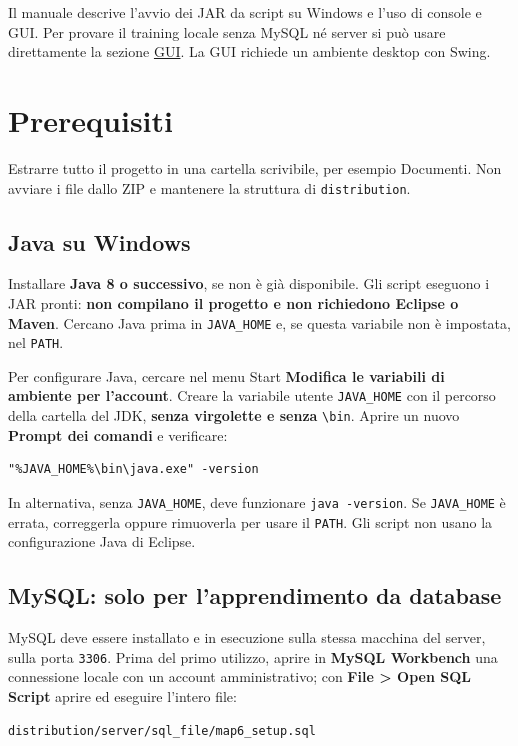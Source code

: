\documentclass[11pt,a4paper]{article}
\begin{document}

Il manuale descrive l'avvio dei JAR da script su Windows e l'uso di console e GUI.
Per provare il training locale senza MySQL né server si può usare direttamente
la sezione \hyperref[sec:gui]{GUI}. La GUI richiede un ambiente desktop con Swing.

\section*{Prerequisiti}

Estrarre tutto il progetto in una cartella scrivibile, per esempio Documenti.
Non avviare i file dallo ZIP e mantenere la struttura di \texttt{distribution}.

\subsection*{Java su Windows}

Installare \textbf{Java 8 o successivo}, se non è già disponibile.
Gli script eseguono i JAR pronti: \textbf{non compilano il progetto e non
richiedono Eclipse o Maven}. Cercano Java prima in \texttt{JAVA\_HOME} e,
se questa variabile non è impostata, nel \texttt{PATH}.

Per configurare Java, cercare nel menu Start \textbf{Modifica le variabili di
ambiente per l'account}. Creare la variabile utente \texttt{JAVA\_HOME} con
il percorso della cartella del JDK, \textbf{senza virgolette e senza}
\texttt{\textbackslash bin}. Aprire un nuovo \textbf{Prompt dei comandi} e verificare:
\begin{lstlisting}
"%JAVA_HOME%\bin\java.exe" -version
\end{lstlisting}

In alternativa, senza \texttt{JAVA\_HOME}, deve funzionare \texttt{java -version}.
Se \texttt{JAVA\_HOME} è errata, correggerla oppure rimuoverla per usare il
\texttt{PATH}. Gli script non usano la configurazione Java di Eclipse.

\subsection*{MySQL: solo per l'apprendimento da database}

MySQL deve essere installato e in esecuzione sulla stessa macchina del server,
sulla porta \texttt{3306}. Prima del primo utilizzo, aprire in
\textbf{MySQL Workbench} una connessione locale con un account amministrativo;
con \textbf{File > Open SQL Script} aprire ed eseguire l'intero file:
\begin{lstlisting}
distribution/server/sql_file/map6_setup.sql
\end{lstlisting}
\end{document}
